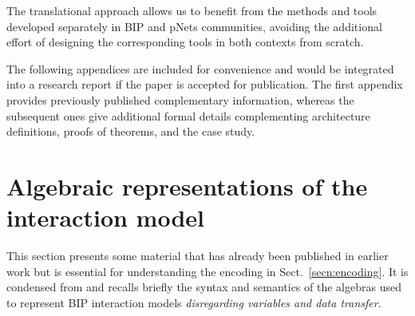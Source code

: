 \documentclass{llncs}
\newcommand{\add}[2][Added]{\todo[color=blue!20, size=\tiny]{#1}{\color{blue}#2}}
\newcommand{\secn}[1]{Sect.~\ref{secn:#1}}
\begin{document}
The translational approach allows us to benefit from the methods
and tools developed separately in BIP and pNets communities,
avoiding the additional effort of designing the corresponding
tools in both contexts from scratch.  


%
%
%
%
%
%
%





\appendix
\clearpage

\noindent
The following appendices are included for convenience and would be integrated into a research report if the paper is accepted for publication. The first appendix provides previously published complementary information, whereas the subsequent ones give additional formal details complementing architecture definitions, proofs of theorems, and the case study.

\section{Algebraic representations of the interaction model}
\label{secn:algebras}

This section presents some material that has already been published in earlier work but is essential for understanding the encoding in \secn{encoding}.
It is condensed from
\cite[Section~4]{BarBliu15-offer-scico} and recalls briefly the syntax
and semantics of the algebras used to represent BIP interaction models
\emph{disregarding variables and data transfer}.
\end{document}
